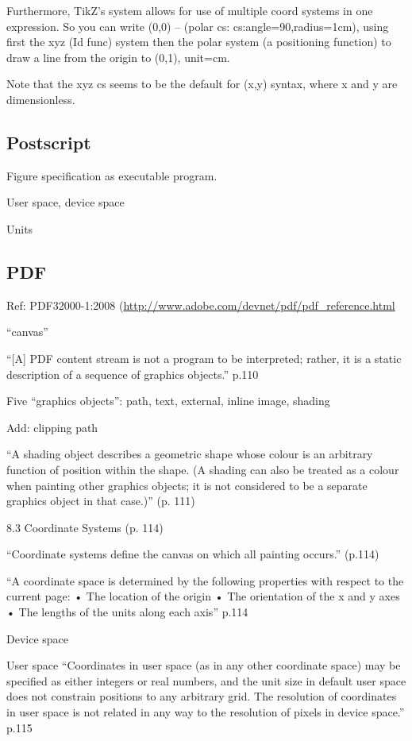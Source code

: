 \documentclass[12pt]{tufte-handout}
\numberwithin{equation}{subsection}
\numberwithin{equation}{subsection}
\begin{document}
{\begin{appendices}
    Furthermore, TikZ's system allows for use of multiple coord systems in
    one expression.  So you can write (0,0) -- (polar cs:
    cs:angle=90,radius=1cm), using first the xyz (Id func) system then the
    polar system (a positioning function) to draw a line from the origin
    to (0,1), unit=cm.

    Note that the xyz cs seems to be the default for (x,y) syntax, where x
    and y are dimensionless.

    \subsection{Postscript}

    Figure specification as executable program.

    User space, device space

    Units

    \subsection{PDF}

    Ref:  PDF32000-1:2008 (\url{http://www.adobe.com/devnet/pdf/pdf\_reference.html}

    ``canvas''

    ``[A] PDF content stream is not a program to be interpreted; rather, it is a static description of a sequence of graphics objects.'' p.110

    Five ``graphics objects'': path, text, external, inline image, shading

    Add: clipping path

    ``A shading object describes a geometric shape whose colour is an arbitrary function of position within the shape. (A shading can also be treated as a colour when painting other graphics objects; it is not considered to be a separate graphics object in that case.)'' (p. 111)


    8.3 Coordinate Systems (p. 114)

    ``Coordinate systems define the canvas on which all painting occurs.'' (p.114)

    ``A coordinate space is determined by the following properties with respect to the current page:
    • The location of the origin
    • The orientation of the x and y axes
    • The lengths of the units along each axis'' p.114

    Device space

    User space
    ``Coordinates in user space (as in any other coordinate space) may be specified as either integers or real numbers, and the unit size in default user space does not constrain positions to any arbitrary grid. The resolution of coordinates in user space is not related in any way to the resolution of pixels in device space.'' p.115


\end{appendices}}
\end{document}
